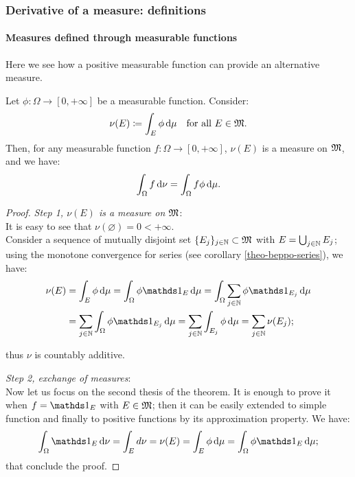 \subsubsection{Derivative of a measure: definitions}\label{derivative-of-a-measure}

\paragraph{Measures defined through measurable functions} Here we see how a positive measurable function can provide an alternative measure.

\begin{theo}
	Let  $\phi: \Omega \to \left[0, +\infty\right]$ be a measurable function. Consider:
	$$\nu(E)\coloneqq\int_E \phi \,\mathrm d\mu \quad \text{for all } E \in \mathfrak M.$$
	Then, for any measurable function $f : \Omega \to \left[0, +\infty\right]$, $\nu(E)$ is a measure on $\mathfrak M$, and we have:
	$$\int_\Omega f \,\mathrm d\nu = \int_\Omega f \phi \,\mathrm d\mu.$$
\end{theo}

\begin{proof} \textit{Step 1, $\nu(E)$ is a measure on $\mathfrak M$}:\\
	It is easy to see that $\nu(\varnothing)=0 < +\infty$.\\
	Consider a sequence of mutually disjoint set $\{E_j\}_{j \in \mathbb N} \subset\mathfrak M$ with $E=\bigcup_{j \in \mathbb N}E_j$; using the monotone convergence for series (see corollary \vref{theo-beppo-series}), we have:
	\begin{align*}
		\nu(E) &= \int_E\phi \,\de\mu
		= \int_\Omega \phi \Ind_E \,\de\mu
		= \int_\Omega \sum_{j\in \NN}\phi \Ind_{E_j} \,\de\mu\\
		&= \sum_{j\in \NN} \int_\Omega \phi \Ind_{E_j} \,\de\mu
		= \sum_{j \in \NN} \int_{E_j} \phi \, \de \mu
		= \sum_{j\in \NN} \nu(E_j)
		;
	\end{align*}
	
	thus $\nu$ is countably additive.
	
	\textit{Step 2, exchange of measures}:\\
	Now let us focus on the second thesis of the theorem. It is enough to prove it when $f=\Ind_E$ with $E \in \mathfrak M$; then it can be easily extended to simple function and finally to positive functions by its approximation property. We have:
	$$
	\int_\Omega\Ind_E \,\de\nu 
	= \int_E d \nu 
	= \nu(E) 
	= \int_E \phi \,\de\mu 
	= \int_\Omega \phi \Ind_E \,\de\mu;$$
	that conclude the proof.
\end{proof}


